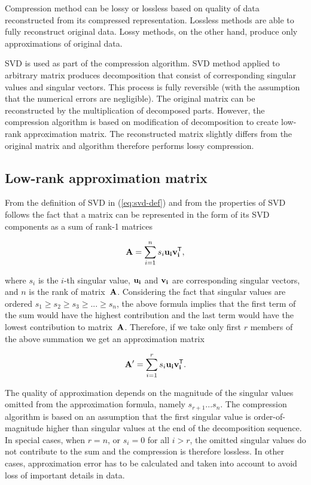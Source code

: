 Compression method can be lossy or lossless based on quality of data reconstructed from its compressed representation. Lossless methods are able to fully reconstruct original data. Lossy methods, on the other hand, produce only approximations of original data. 

SVD is used as part of the compression algorithm. SVD method applied to arbitrary matrix produces decomposition that consist of corresponding singular values and singular vectors. This process is fully reversible (with the assumption that the numerical errors are negligible). The original matrix can be reconstructed by the multiplication of decomposed parts. However, the compression algorithm is based on modification of decomposition to create low-rank approximation matrix. The reconstructed matrix slightly differs from the original matrix and algorithm therefore performs lossy compression.

\subsection{Low-rank approximation matrix}

From the definition of SVD in (\ref{eq:svd-def}) and from the properties of SVD follows the fact that a matrix can be represented in the form of its SVD components as a sum of rank-1 matrices

\begin{equation}
\mathbf{A}=\sum_{i=1}^{n} s_{i}\bf{u}_i\bf{v}_i^{\mathsf{T}},
\label{eq:svd-expansion}
\end{equation}

\noindent
where $s_i$ is the $i$-th singular value, $\bf{u}_i$ and $\bf{v}_i$ are corresponding singular vectors, and $n$ is the rank of matrix~$\mathbf{A}$. Considering the fact that singular values are ordered $s_{1} \geq s_{2} \geq s_{3} \geq ... \geq s_{n}$, the above formula implies that the first term of the sum would have the highest contribution and the last term would have the lowest contribution to matrix~$\mathbf{A}$. Therefore, if we take only first $r$ members of the above summation we get an approximation matrix

\begin{equation}
\mathbf{A'}=\sum_{i=1}^{r} s_{i}\bf{u}_i\bf{v}_i^{\mathsf{T}}.
\label{eq:svd-approx-expansion}
\end{equation}

The quality of approximation depends on the magnitude of the singular values omitted from the approximation formula, namely $s_{r+1} ...  s_{n}$. The compression algorithm is based on an assumption that the first singular value is order-of-magnitude higher than singular values at the end of the decomposition sequence. In special cases, when $r=n$, or $s_{i}=0$ for all $i > r$, the omitted singular values do not contribute to the sum and the compression is therefore lossless. In other cases, approximation error has to be calculated and taken into account to avoid loss of important details in data.

